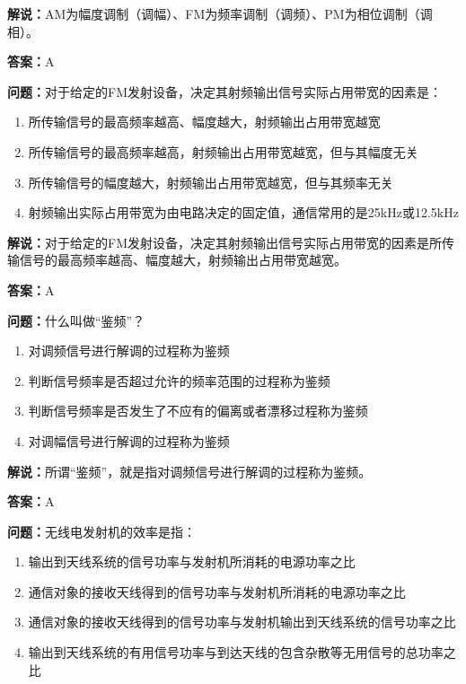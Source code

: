 \textbf{解说：}AM为幅度调制（调幅）、FM为频率调制（调频）、PM为相位调制（调相）。%

\textbf{答案：}A

\textbf{问题：}对于给定的FM发射设备，决定其射频输出信号实际占用带宽的因素是：

\begin{enumerate}[label=\Alph*), leftmargin=3em]
	\item 所传输信号的最高频率越高、幅度越大，射频输出占用带宽越宽
	\item 所传输信号的最高频率越高，射频输出占用带宽越宽，但与其幅度无关
	\item 所传输信号的幅度越大，射频输出占用带宽越宽，但与其频率无关
	\item 射频输出实际占用带宽为由电路决定的固定值，通信常用的是25kHz或12.5kHz
\end{enumerate}

\textbf{解说：}对于给定的FM发射设备，决定其射频输出信号实际占用带宽的因素是所传输信号的最高频率越高、幅度越大，射频输出占用带宽越宽。%

\textbf{答案：}A

\textbf{问题：}什么叫做“鉴频”？

\begin{enumerate}[label=\Alph*), leftmargin=3em]
	\item 对调频信号进行解调的过程称为鉴频
	\item 判断信号频率是否超过允许的频率范围的过程称为鉴频
	\item 判断信号频率是否发生了不应有的偏离或者漂移过程称为鉴频
	\item 对调幅信号进行解调的过程称为鉴频
\end{enumerate}

\textbf{解说：}所谓“鉴频”，就是指对调频信号进行解调的过程称为鉴频。%

\textbf{答案：}A

\textbf{问题：}无线电发射机的效率是指：

\begin{enumerate}[label=\Alph*), leftmargin=3em]
	\item 输出到天线系统的信号功率与发射机所消耗的电源功率之比
	\item 通信对象的接收天线得到的信号功率与发射机所消耗的电源功率之比
	\item 通信对象的接收天线得到的信号功率与发射机输出到天线系统的信号功率之比
	\item 输出到天线系统的有用信号功率与到达天线的包含杂散等无用信号的总功率之比
\end{enumerate}

